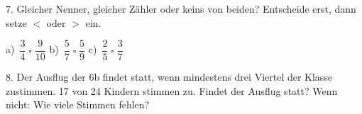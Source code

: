 \documentclass[11pt]{article}
\begin{document}
\begin{pfaufg}{}{7.}{}
Gleicher Nenner, gleicher Zähler oder keins von beiden? Entscheide erst, dann setze $<$ oder $>$ ein. \par\vspace{3pt} a)~$\dfrac{3}{4} \;\square\; \dfrac{9}{10}$ \qquad b)~$\dfrac{5}{7} \;\square\; \dfrac{5}{9}$ \qquad c)~$\dfrac{2}{5} \;\square\; \dfrac{3}{7}$
\end{pfaufg}

\begin{pfaufg}{}{8.}{}
Der Ausflug der 6b findet statt, wenn mindestens drei Viertel der Klasse zustimmen. 17 von 24 Kindern stimmen zu. Findet der Ausflug statt? Wenn nicht: Wie viele Stimmen fehlen?
\end{pfaufg}
\end{document}
